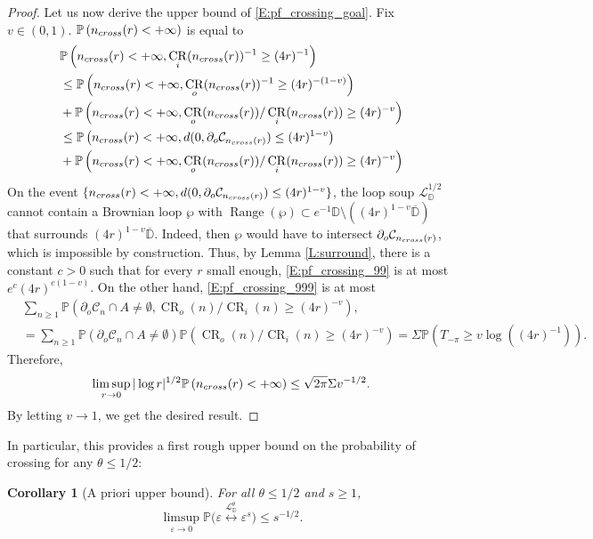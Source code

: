 \documentclass[11pt]{article}
\newtheorem{corollary}[theorem]{Corollary}
\theoremstyle{remark}
\newcommand{\D}{\mathbb{D}}
\newcommand{\Cc}{\mathcal{C}}
\newcommand{\Lc}{\mathcal{L}}
\newcommand{\Prob}[1]{\mathbb{P} \left( #1 \right) }
\renewcommand{\P}{\mathbb{P}}
\newcommand{\eps}{\varepsilon}
\DeclareMathOperator{\CR}{CR}
\DeclareMathOperator{\Range}{Range}
\numberwithin{equation}{section}
\begin{document}
\begin{proof}
Let us now derive the upper bound of \eqref{E:pf_crossing_goal}.
Fix $v\in (0,1)$.
$\Prob{n_{\rm cross}(r) <+\infty}$ is equal to
\begin{align}
\nonumber
& \Prob{n_{\rm cross}(r) <+\infty,\CR_{i}(n_{\rm cross}(r))^{-1}\geq (4 r)^{-1}}
\\
\nonumber
&\leq 
\Prob{n_{\rm cross}(r) <+\infty,\CR_{o}(n_{\rm cross}(r))^{-1}\geq (4 r)^{-(1-v)}}
\\ \nonumber & +\Prob{n_{\rm cross}(r) <+\infty,
\CR_{o}(n_{\rm cross}(r))/\CR_{i}(n_{\rm cross}(r))\geq (4 r)^{-v}}
\\
\label{E:pf_crossing_99}
&\leq 
\Prob{n_{\rm cross}(r) <+\infty, 
d(0,\partial_{o}\Cc_{n_{\rm cross}(r)})\leq (4 r)^{1-v}}
\\
\label{E:pf_crossing_999} & +\Prob{n_{\rm cross}(r) <+\infty,
\CR_{o}(n_{\rm cross}(r))/\CR_{i}(n_{\rm cross}(r))\geq (4 r)^{-v}}
\end{align}
On the event $\{n_{\rm cross}(r) <+\infty, 
d(0,\partial_{o}\Cc_{n_{\rm cross}(r)})\leq (4 r)^{1-v}\}$,
the loop soup $\Lc^{1/2}_{\D}$ cannot contain a Brownian loop $\wp$
with
$\Range(\wp)\subset e^{-1}\D\setminus((4 r)^{1-v}\overline{\D})$
that surrounds $(4 r)^{1-v}\overline{\D}$.
Indeed, then $\wp$ would have to intersect $\partial_{o}\Cc_{n_{\rm cross}(r)}$,
which is impossible by construction.
Thus, by Lemma \ref{L:surround}, there is a constant $c>0$ such that for every
$r$ small enough, \eqref{E:pf_crossing_99} is at most $e^{c} (4 r)^{c(1-v)}$. On the other hand, \eqref{E:pf_crossing_999} is at most
\begin{align*}
& \sum_{n\geq 1}
\Prob{\partial_{o}\Cc_{n}\cap A\neq \emptyset,
\CR_{o}(n)/\CR_{i}(n)\geq (4 r)^{-v}}, 
\\
& = 
\sum_{n\geq 1}
\Prob{\partial_{o}\Cc_{n}\cap A\neq \emptyset}
\Prob{\CR_{o}(n)/\CR_{i}(n)\geq (4 r)^{-v}}
=
\Sigma
\Prob{T_{-\pi}\geq v\log ((4 r)^{-1})}. 
\end{align*}
Therefore,
\begin{displaymath}
\limsup_{r\to 0} \vert\log r\vert^{1/2}\Prob{n_{\rm cross}(r) <+\infty}
\leq \sqrt{2\pi}\Sigma v^{-1/2}.
\end{displaymath}
By letting $v\to 1$, we get the desired result.
\end{proof}


In particular, this provides a first rough upper bound on the probability of crossing for any $\theta \leq 1/2$:

\begin{corollary}[A priori upper bound]\label{C:a_priori_u_bound}
For all $\theta \leq 1/2$ and $s \geq 1$,
\begin{equation}
\label{E:L_a_priori_u_bound}
\limsup_{\eps \to 0} \P \Big( \eps \overset{\Lc_\D^\theta}{\longleftrightarrow} \eps^s \Big) \leq s^{-1/2}.
\end{equation}
\end{corollary}
\end{document}
